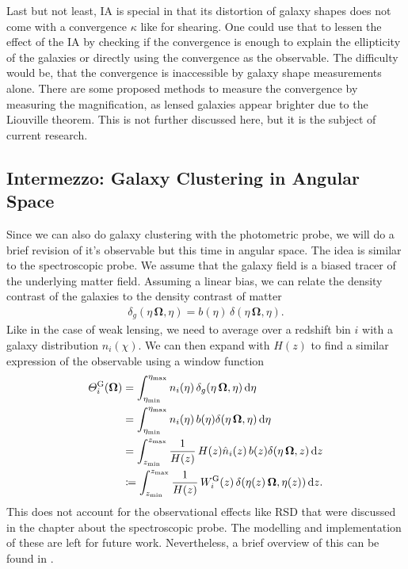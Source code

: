 \documentclass[../main.tex]{subfiles}
\begin{document}
Last but not least, IA is special in that its distortion of galaxy shapes does not come with a convergence $\kappa$ like for shearing. One could use that to lessen the effect of the IA by checking if the convergence is enough to explain the ellipticity of the galaxies or directly using the convergence as the observable. The difficulty would be, that the convergence is inaccessible by galaxy shape measurements alone. There are some proposed methods to measure the convergence by measuring the magnification, as lensed galaxies appear brighter due to the Liouville theorem. This is not further discussed here, but it is the subject of current research.

\subsection*{ Intermezzo: Galaxy Clustering in Angular Space}
Since we can also do galaxy clustering with the photometric probe, we will do a brief revision of it's observable but this time in angular space. The idea is similar to the spectroscopic probe. We assume that the galaxy field is a biased tracer of the underlying matter field. Assuming a linear bias, we can relate the density contrast of the galaxies to the density contrast of matter \begin{align*}
    \delta_g(\eta\,\boldsymbol{\Omega},\eta) = b(\eta)\,\delta(\eta\,\boldsymbol{\Omega},\eta).
\end{align*}
Like in the case of weak lensing, we need to average over a redshift bin $i$ with a galaxy distribution $n_i(\chi)$. We can then expand with $H(z)$ to find a similar expression of the observable using a window function \begin{align}
    \varTheta^\mathrm{G}_i(\boldsymbol{\Omega}) &= \int_{\eta_\mathrm{min}}^{\eta_\mathrm{max}} n_i(\eta) \, \delta_g(\eta\,\boldsymbol{\Omega},\eta) \,\mathrm{d} \eta \\
    &= \int_{\eta_\mathrm{min}}^{\eta_\mathrm{max}} n_i(\eta) \, b(\eta) \delta(\eta\,\boldsymbol{\Omega},\eta) \,\mathrm{d} \eta \nonumber \\
    &=  \int_{z_\mathrm{min}}^{z_\mathrm{max}} \frac{1}{H(z)}\,H(z)\hat{n}_i(z) \, b(z) \delta(\eta\,\boldsymbol{\Omega},z) \,\mathrm{d} z \nonumber \\
    &\coloneqq \int_{z_\mathrm{min}}^{z_\mathrm{max}} \frac{1}{H(z)} \, W^\mathrm{G}_i(z) \, \delta(\eta(z)\,\boldsymbol{\Omega},\eta(z)) \,\mathrm{d} z.
\end{align}
This does not account for the observational effects like RSD that were discussed in the chapter about the spectroscopic probe. The modelling and implementation of these are left for future work. Nevertheless, a brief overview of this can be found in \cite{euclidPhotoTanidis}.\\
\end{document}
